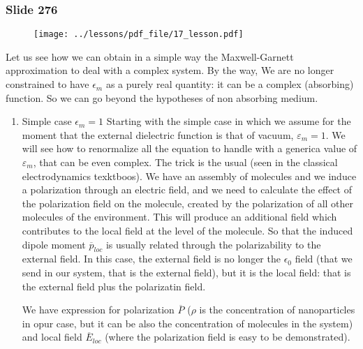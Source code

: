 \documentclass[../main/main.tex]{subfiles}
\begin{document}
\newpage

\subsubsection{Slide 276}

\begin{figure}[h!]
\centering
\texttt{[image: ../lessons/pdf\_file/17\_lesson.pdf]}
\end{figure}

Let us see how we can obtain in a simple way the Maxwell-Garnett approximation to deal with a complex system. By the way, We are no longer constrained to have $\epsilon_{m}$ as a purely real quantity: it can be a complex (absorbing) function. So we can go beyond the hypotheses of non absorbing medium.
\begin{enumerate}
    \item{Simple case $\epsilon_{m} = 1$ }
    Starting with the simple case in which we assume for the moment that the external dielectric function is that of vacuum, \( \varepsilon _m =1 \).
     We will see how to renormalize all the equation to handle with a generica value of \( \varepsilon _m \), that can be even complex. The trick is the usual (seen in the classical electrodynamics texktboos). We have an assembly of molecules and we induce a polarization through an electric field, and we need to calculate the effect of the polarization field on the molecule, created by the polarization of all other molecules of the environment. This will produce an additional field which contributes to the local field at the level of the molecule. So that the induced dipole moment $\overline{p}_{loc}$ is usually related through the polarizability to the external field. In this case, the external field is no longer the $\epsilon_{0}$ field (that we send in our system, that is the external field), but it is the local field: that is the external field plus the polarizatin field.

    We have expression for polarization $\overline{P}$ (\( \rho  \) is the concentration of nanoparticles in opur case, but it can be also the concentration of molecules in the system) and local field $\overline{E}_{loc}$ (where the polarization field is easy to be demonstrated).


\end{enumerate}
\end{document}
